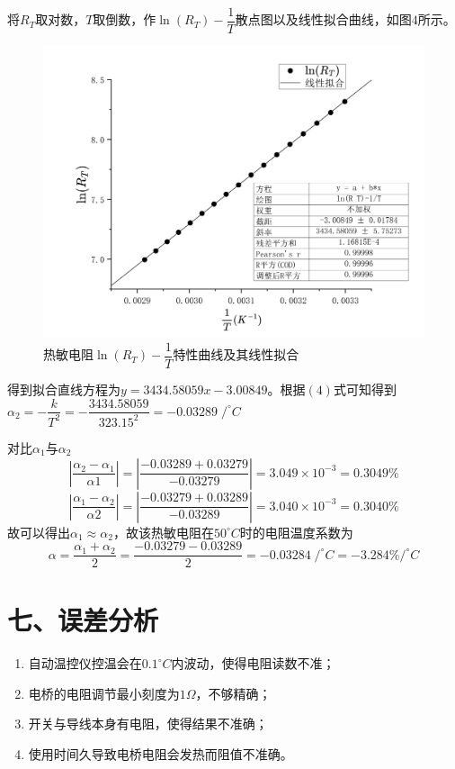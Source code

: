 \documentclass[11pt]{article}
\begin{document}
将$R_T$取对数，$T$取倒数，作$\ln(R_T)-\dfrac{1}{T}$散点图以及线性拟合曲线，如图$4$所示。
\begin{figure}[H]
    \centering
    \includegraphics[width=16cm]{Figs/Graph2.png}
    \caption{热敏电阻$\ln(R_T)-\dfrac{1}{T}$特性曲线及其线性拟合}
\end{figure}
得到拟合直线方程为$y=3434.58059x-3.00849$。根据$(4)$式可知得到$\alpha_2=-\dfrac{k}{T^2}=-\dfrac{3434.58059}{323.15^2}=-0.03289\;/^{\circ}C$

对比$\alpha_1$与$\alpha_2$
$$\left|\dfrac{\alpha_2-\alpha_1}{\alpha1}\right|=\left|\dfrac{-0.03289+0.03279}{-0.03279}\right|=3.049\times10^{-3}=0.3049\%
$$
$$\left|\dfrac{\alpha_1-\alpha_2}{\alpha2}\right|=\left|\dfrac{-0.03279+0.03289}{-0.03289}\right|=3.040\times10^{-3}=0.3040\%
$$
故可以得出$\alpha_1\approx\alpha_2$，故该热敏电阻在$50^{\circ}C$时的电阻温度系数为
$$
\alpha=\dfrac{\alpha_1+\alpha_2}{2}=\dfrac{-0.03279-0.03289}{2}=-0.03284\;/^{\circ}C=-3.284\%/^{\circ}C
$$

\section*{七、误差分析}

\begin{enumerate}
    \item 自动温控仪控温会在$0.1^{\circ}C$内波动，使得电阻读数不准；
    \item 电桥的电阻调节最小刻度为$1\Omega$，不够精确；
    \item 开关与导线本身有电阻，使得结果不准确；
    \item 使用时间久导致电桥电阻会发热而阻值不准确。
\end{enumerate}
\end{document}
